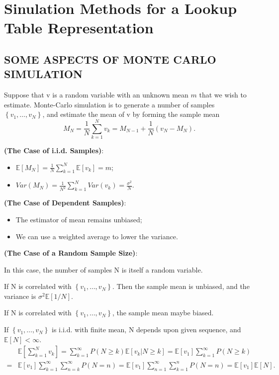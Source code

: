 
\section{Sinulation Methods for a Lookup Table Representation}%


\subsection{SOME ASPECTS OF MONTE CARLO SIMULATION}%

Suppose that v is a random variable with an unknown mean $ m $ that we wish to estimate.
Monte-Carlo simulation is to generate a number of samples $ \left\{ v_1, \ldots, v_N \right\} $,
and estimate the mean of v by forming the sample mean
\[
    M_N = \frac{1}{N} \sum^{N}_{k=1} v_k = M_{N-1} + \frac{1}{N} (v_{N} - M_N).
\]

\textbf{(The Case of i.i.d. Samples)}:
\begin{itemize}
    \item $ \mathbb{E}\left[ M_N \right] = \frac{1}{N}  \sum^{N}_{k=1} \mathbb{E}\left[ v_k \right] = m $;
    \item $ Var(M_N) = \frac{1}{N^2} \sum^{N}_{k=1} Var(v_k) = \frac{\sigma^2}{N}  $.
\end{itemize}

\textbf{(The Case of Dependent Samples)}:
\begin{itemize}
    \item The estimator of mean remains unbiased;
    \item We can use a weighted average to lower the variance.
\end{itemize}

\textbf{(The Case of a Random Sample Size)}:

In this case, the number of samples N is itself a random variable.

If N is correlated with $ \left\{ v_1, \ldots, v_N \right\} $. Then the sample mean is unbiased, and the variance is $ \sigma^2 \mathbb{E}\left[ 1/N \right] $.

If N is correlated with $ \left\{ v_1, \ldots, v_N \right\} $, the sample mean maybe biased.

\begin{theorem}
If $ \left\{ v_1, \ldots, v_N \right\} $ is {i.i.d.} with finite mean, N depends upon given sequence, and $ \mathbb{E}\left[ N \right] < \infty $.
\begin{align*}
    & \mathbb{E}\left[ \sum^{N}_{k=1} v_k \right] = \sum^{\infty}_{k=1} P(N \ge k) \mathbb{E} \left[ v_k | N \ge k \right]
    = \mathbb{E}\left[ v_1 \right] \sum^{\infty}_{k=1} P\left( N \ge k \right)\\
    =& \mathbb{E} [v_1] \sum^{\infty}_{k = 1} \sum^{\infty}_{n=k} P(N = n)
    = \mathbb{E}\left[ v_1 \right] \sum^{\infty}_{n=1} \sum^{n}_{k=1} P(N = n) = \mathbb{E}\left[ v_1 \right] \mathbb{E}\left[ N \right].
\end{align*}
\end{theorem}

